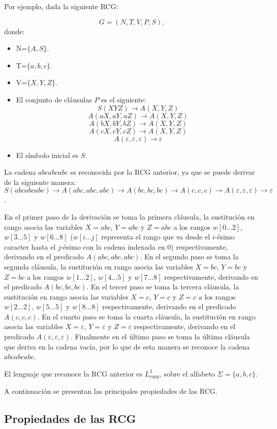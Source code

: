 \documentclass[12pt]{article}
\begin{document}
Por ejemplo, dada la siguiente RCG:

\[
    G = (N, T, V, P, S),
\]
donde:

\begin{itemize}
    \item  N=$\{A,S\}$.
    \item T=$\{a,b,c\}$.
    \item V=$\{X,Y,Z\}$.
    \item El conjunto de cláusulas $P$ es el siguiente:
          $$S(XYZ)\to A(X,Y,Z)$$
          $$A(aX,aY,aZ)\to A(X,Y,Z)$$
          $$A(bX,bY,bZ)\to A(X,Y,Z)$$
          $$A(cX,cY,cZ)\to A(X,Y,Z)$$
          $$A(\varepsilon,\varepsilon,\varepsilon)\to \varepsilon$$
    \item El símbolo inicial es $S$.
\end{itemize}
La cadena $abcabcabc$ es reconocida por la RCG anterior, ya que se puede derivar de la siguiente manera:
$$S(abcabcabc)\to A(abc,abc,abc)\to A(bc,bc,bc)\to A(c,c,c)\to A(\varepsilon,\varepsilon,\varepsilon)\to \varepsilon$$.

En el primer paso de la derivación se toma la primera cláusula, la sustitución en rango asocia las variables $X=abc$, $Y=abc$ y $Z=abc$
a los rangos $w[0\dots 2]$, $w[3\dots 5]$ y $w[6\dots 8]$ ($w[i\dots j]$ representa el rango que va desde el $i$-ésimo caracter hasta el $j$-ésimo
con la cadena indexada en 0) respectivamente, derivando en el predicado $A(abc,abc,abc)$. En el segundo paso se
toma la segunda cláusula, la sustitución en rango asocia las variables $X=bc$, $Y=bc$ y $Z=bc$ a los rangos $w[1\dots 2]$, $w[4\dots 5]$ y $w[7\dots 8]$
respectivamente, derivando en el predicado $A(bc,bc,bc)$. En el tercer paso se toma la tercera cláusula,
la sustitución en rango asocia las variables $X=c$, $Y=c$ y $Z=c$ a los rangos $w[2\dots 2]$, $w[5\dots 5]$ y
$w[8\dots 8]$ respectivamente, derivando en el predicado $A(c,c,c)$.
En el cuarto paso se toma la cuarta cláusula, la sustitución en rango asocia las variables
$X=\varepsilon$, $Y=\varepsilon$ y $Z=\varepsilon$ respectivamente, derivando en el predicado
$A(\varepsilon,\varepsilon,\varepsilon)$. Finalmente en el  último paso se toma la última cláusula
que deriva en la cadena vacía, por lo que de esta manera se reconoce la cadena $abcabcabc$.

El lenguaje que reconoce la RCG anterior es $L_{copy}^3$, sobre el alfabeto $\Sigma=\{a,b,c\}$.

A continuación se presentan las principales propiedades de las RCG.
\subsection{Propiedades de las RCG}
\end{document}
